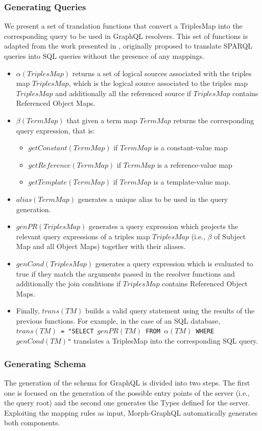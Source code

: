 \subsubsection{Generating Queries} 
We present a set of translation functions that convert a TriplesMap into the corresponding query to be used in GraphQL resolvers. This set of functions is adapted from the work presented in \citep{chebotko2009semantics}, originally proposed to translate SPARQL queries into SQL queries without the presence of any mappings. 
\begin{itemize}
    \item $\alpha(TriplesMap)$ returns a set of logical sources associated with the triples map $TriplesMap$, which is the logical source associated to the triples map $TriplesMap$ and additionally all the referenced source if $TriplesMap$ contains Referenced Object Maps.
    \item $\beta(TermMap)$ that given a term map $TermMap$ returns the corresponding query expression, that is: 
    \begin{itemize}
        \item $getConstant(TermMap)$ if $TermMap$ is a constant-value map
        \item $getReference(TermMap)$ if $TermMap$ is a reference-value map
        \item $getTemplate(TermMap)$ if $TermMap$ is a template-value map.
    \end{itemize}    
    \item $alias(TermMap)$ generates a unique alias to be used in the query generation.    
    \item $genPR(TriplesMap)$ generates a query expression which projects the relevant query expressions of a triples map $TriplesMap$ (i.e., $\beta$ of Subject Map and all Object Maps) together with their aliases.
    \item $genCond(TriplesMap)$ generates a query expression which is evaluated to true if they match the arguments passed in the resolver functions and additionally the join conditions if $TriplesMap$ contains Referenced Object Maps.
    \item Finally, $trans(TM)$ builds a valid query statement using the results of the previous functions. For example, in the case of an SQL database, \texttt{$trans(TM)$ = "SELECT $genPR(TM)$ FROM $\alpha(TM)$ WHERE $genCond(TM)$"} translates a TriplesMap into the corresponding SQL query.
\end{itemize}

\subsubsection{Generating Schema}
The generation of the schema for GraphQL is divided into two steps. The first one is focused on the generation of the possible entry points of the server (i.e., the query root) and the second one generates the Types defined for the server. Exploiting the mapping rules as input, Morph-GraphQL automatically generates both components.

